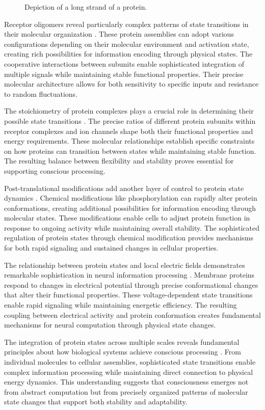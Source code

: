 \begin{refsection}
\begin{figure}[h]
    \caption{Depiction of a long strand of a protein.}
\end{figure}

Receptor oligomers reveal particularly complex patterns of state transitions in their molecular organization \cite{Lindorff-Larsen2016}. These protein assemblies can adopt various configurations depending on their molecular environment and activation state, creating rich possibilities for information encoding through physical states. The cooperative interactions between subunits enable sophisticated integration of multiple signals while maintaining stable functional properties. Their precise molecular architecture allows for both sensitivity to specific inputs and resistance to random fluctuations.

The stoichiometry of protein complexes plays a crucial role in determining their possible state transitions \cite{Brangwynne2015}. The precise ratios of different protein subunits within receptor complexes and ion channels shape both their functional properties and energy requirements. These molecular relationships establish specific constraints on how proteins can transition between states while maintaining stable function. The resulting balance between flexibility and stability proves essential for supporting conscious processing.

Post-translational modifications add another layer of control to protein state dynamics \cite{Wright2015}. Chemical modifications like phosphorylation can rapidly alter protein conformations, creating additional possibilities for information encoding through molecular states. These modifications enable cells to adjust protein function in response to ongoing activity while maintaining overall stability. The sophisticated regulation of protein states through chemical modification provides mechanisms for both rapid signaling and sustained changes in cellular properties.

The relationship between protein states and local electric fields demonstrates remarkable sophistication in neural information processing \cite{Tokuriki2009}. Membrane proteins respond to changes in electrical potential through precise conformational changes that alter their functional properties. These voltage-dependent state transitions enable rapid signaling while maintaining energetic efficiency. The resulting coupling between electrical activity and protein conformation creates fundamental mechanisms for neural computation through physical state changes.

The integration of protein states across multiple scales reveals fundamental principles about how biological systems achieve conscious processing \cite{Thirumalai2017}. From individual molecules to cellular assemblies, sophisticated state transitions enable complex information processing while maintaining direct connection to physical energy dynamics. This understanding suggests that consciousness emerges not from abstract computation but from precisely organized patterns of molecular state changes that support both stability and adaptability.


\end{refsection}
